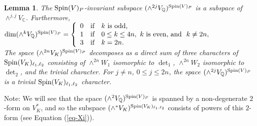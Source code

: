 \documentclass[12pt]{amsart}
\numberwithin{equation}{subsection}
\theoremstyle{plain}
\newtheorem{lem}[thm]{Lemma}
\theoremstyle{definition}
\newcommand{\CC}{{\mathbb C}}
\newcommand{\QQ}{{\mathbb Q}}
\newcommand{\Spin}{{\rm Spin}}
\begin{document}
\begin{lem}
\label{lemma-Spin-V-P-invariant-classes-are-Hodge}
The $\Spin(V)_P$-invariant subspace $(\wedge^{2j}V_\QQ)^{\Spin(V)_P}$ is a subspace of $\wedge^{j,j}V_\CC$. Furthermore,
$\dim(\wedge^kV_\QQ)^{\Spin(V)_P}=
\left\{
\begin{array}{ccl}
0 & \mbox{if} & k \ \mbox{is odd,}
\\
1 &  \mbox{if} &0\leq k \leq 4n,\ k \ \mbox{is even, and}\ \ k\neq 2n,
\\
3 & \mbox{if} & k=2n.
\end{array}
\right.
$\\
The space $(\wedge^{2n}V_K)^{\Spin(V)_P}$ decomposes as a direct sum of three characters of $\Spin(V_K)_{\ell_1,\ell_2}$ consisting of $\wedge^{2n}W_1$ isomorphic to $\det_1$, $\wedge^{2n}W_2$ isomorphic to $\det_2$,  and the trivial character. For $j\neq n$, $0\leq j\leq 2n$, the space $(\wedge^{2j}V_\QQ)^{\Spin(V)_P}$ is a trivial $\Spin(V_K)_{\ell_1,\ell_2}$ character.
\end{lem}

Note: We will see that the space $(\wedge^2V_\QQ)^{\Spin(V)_P}$ is spanned by a non-degenerate $2$-form on $V_K^*$, and so the subspace $(\wedge^*V_K)^{\Spin(V_K)_{\ell_1,\ell_2}}$ consists of powers of this $2$-form (see Equation  (\ref{eq-Xi})).
\end{document}

